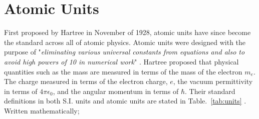     \section{Atomic Units} \label{sec:atomic_units}    
        First proposed by Hartree in November of 1928, atomic units have since become the standard across all of atomic physics. Atomic units were designed with the purpose of "\textit{eliminating various universal constants from equations and also to avoid high powers of 10 in numerical work}" \cite{atomic_units_definition}. Hartree proposed that physical quantities such as the mass are measured in terms of the mass of the electron $m_e$. The charge measured in terms of the electron charge, $e$, the vacuum permittivity in terms of $4\pi \epsilon_0$, and the angular momentum in terms of $\hbar$. Their standard definitions in both S.I. units and atomic units are stated in Table.~\ref{tab:units} \cite{Mohr_Newell_Taylor_Tiesinga_2024}. Written mathematically;
%
        \begin{table}[b]
            \centering 
            \caption{Table of fundamental constants expressed in S.I. units and atomic units.}\label{tab:units}
        \end{table}
